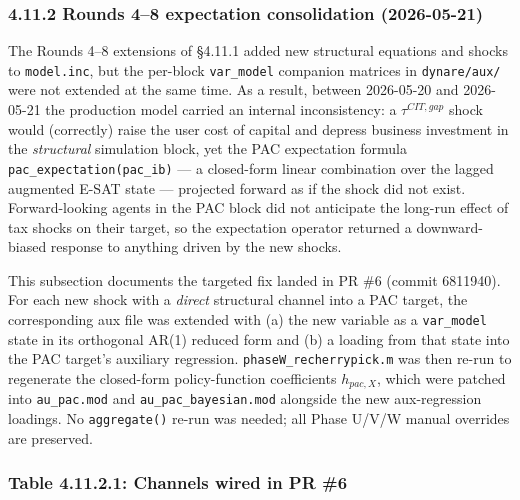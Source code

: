\documentclass[
]{article}
\begin{document}
\subsubsection{4.11.2 Rounds 4--8 expectation consolidation
(2026-05-21)}\label{rounds-48-expectation-consolidation-2026-05-21}

The Rounds 4--8 extensions of §4.11.1 added new structural equations and
shocks to \texttt{model.inc}, but the per-block \texttt{var\_model}
companion matrices in \texttt{dynare/aux/} were not extended at the same
time. As a result, between 2026-05-20 and 2026-05-21 the production
model carried an internal inconsistency: a \(\tau^{CIT,gap}\) shock
would (correctly) raise the user cost of capital and depress business
investment in the \emph{structural} simulation block, yet the PAC
expectation formula \texttt{pac\_expectation(pac\_ib)} --- a closed-form
linear combination over the lagged augmented E-SAT state --- projected
forward as if the shock did not exist. Forward-looking agents in the PAC
block did not anticipate the long-run effect of tax shocks on their
target, so the expectation operator returned a downward-biased response
to anything driven by the new shocks.

This subsection documents the targeted fix landed in PR \#6 (commit
6811940). For each new shock with a \emph{direct} structural channel
into a PAC target, the corresponding aux file was extended with (a) the
new variable as a \texttt{var\_model} state in its orthogonal AR(1)
reduced form and (b) a loading from that state into the PAC target's
auxiliary regression. \texttt{phaseW\_recherrypick.m} was then re-run to
regenerate the closed-form policy-function coefficients \(h_{pac,X}\),
which were patched into \texttt{au\_pac.mod} and
\texttt{au\_pac\_bayesian.mod} alongside the new aux-regression
loadings. No \texttt{aggregate()} re-run was needed; all Phase U/V/W
manual overrides are preserved.

\subsubsection{Table 4.11.2.1: Channels wired in PR
\#6}\label{table-4.11.2.1-channels-wired-in-pr-6}
\end{document}
